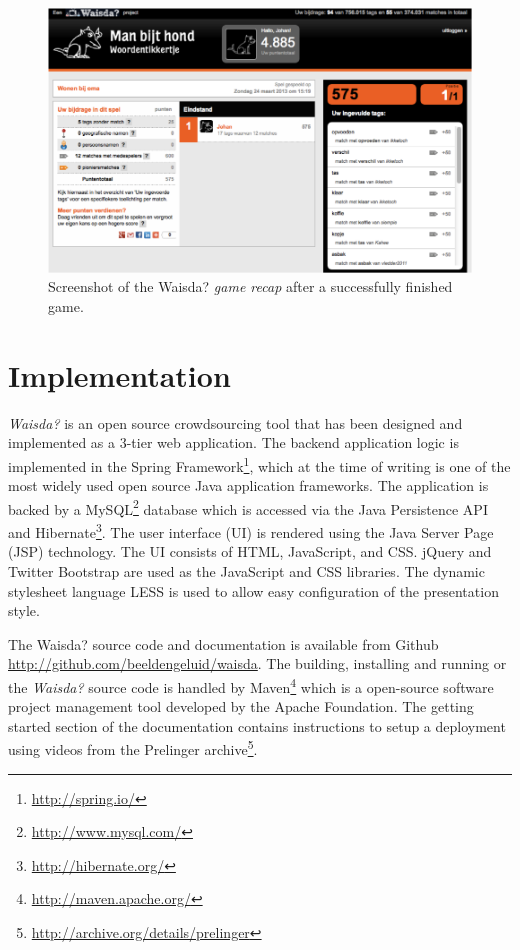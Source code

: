 \begin{figure}[t!]
\centering
\includegraphics[width=\columnwidth]{figs/recap} 
\caption{Screenshot of the Waisda? \textit{game recap} after a successfully finished game.}
\label{recap}
\end{figure}

\section{Implementation}
\textit{Waisda?} is an open source crowdsourcing tool that has been designed and implemented as a 3-tier web application. The backend application logic is implemented in the Spring Framework\footnote{\url{http://spring.io/}}, which at the time of writing is one of the most widely used open source Java application frameworks. The application is backed by a MySQL\footnote{\url{http://www.mysql.com/}} database which is accessed via the Java Persistence API and Hibernate\footnote{\url{http://hibernate.org/}}. The user interface (UI) is rendered using the Java Server Page (JSP) technology. The UI consists of HTML, JavaScript, and CSS. jQuery and Twitter Bootstrap are used as the JavaScript and CSS libraries. The dynamic
stylesheet language LESS is used to allow easy configuration of the presentation style.

The Waisda? source code and documentation is available from Github \url{http://github.com/beeldengeluid/waisda}. The building, installing and running or the \textit{Waisda?} source code is handled by Maven\footnote{\url{http://maven.apache.org/}} which is a open-source software project management tool developed by the Apache Foundation. The getting started section of the documentation contains instructions to setup a deployment using videos from the Prelinger archive\footnote{\url{http://archive.org/details/prelinger}}.

